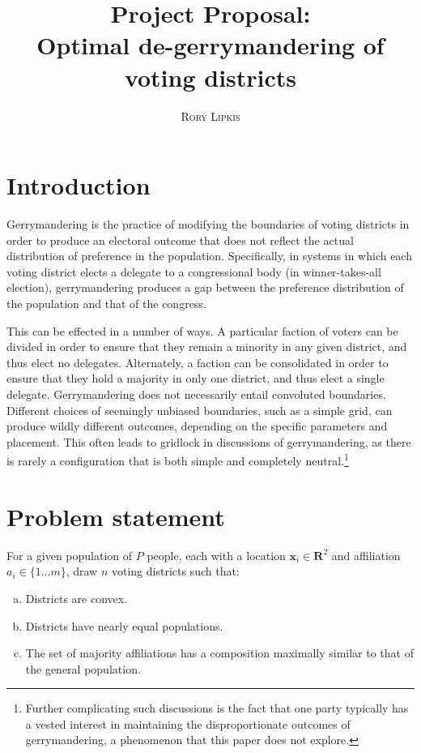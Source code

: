 \documentclass{article}
\title{\textbf{Project Proposal:\\Optimal de-gerrymandering of voting districts}}
\author{\textsc{Rory Lipkis}}
\date{}
\begin{document}
\maketitle

\section*{Introduction}
Gerrymandering is the practice of modifying the boundaries of voting districts in order to produce an electoral outcome that does not reflect the actual distribution of preference in the population. Specifically, in systems in which each voting district elects a delegate to a congressional body (in winner-takes-all election), gerrymandering produces a gap between the preference distribution of the population and that of the congress.

This can be effected in a number of ways. A particular faction of voters can be divided in order to ensure that they remain a minority in any given district, and thus elect no delegates. Alternately, a faction can be consolidated in order to ensure that they hold a majority in only one district, and thus elect a single delegate. Gerrymandering does not necessarily entail convoluted boundaries. Different choices of seemingly unbiased boundaries, such as a simple grid, can produce wildly different outcomes, depending on the specific parameters and placement. This often leads to gridlock in discussions of gerrymandering, as there is rarely a configuration that is both simple and completely neutral.\footnote{Further complicating such discussions is the fact that one party typically has a vested interest in maintaining the disproportionate outcomes of gerrymandering, a phenomenon that this paper does not explore.}

\section*{Problem statement}
For a given population of $P$ people, each with a location $\mathbf{x}_{i} \in \mathbf{R}^{2}$ and affiliation $a_{i} \in \{1 \dots m\}$, draw $n$ voting districts such that:
\begin{enumerate}[(a)]
	\item Districts are convex.
	\item Districts have nearly equal populations.
	\item The set of majority affiliations has a composition maximally similar to that of the general population.
\end{enumerate}
\end{document}
